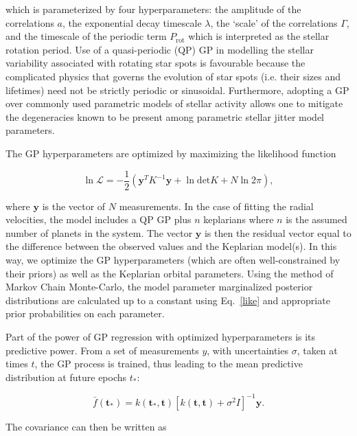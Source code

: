 \noindent which is parameterized by four hyperparameters: the amplitude of 
the correlations $a$, the exponential decay timescale $\lambda$, the `scale' of 
the correlations $\Gamma$, and the timescale of the periodic term 
$P_{\mathrm{rot}}$ which is interpreted as the stellar rotation period. 
Use of a quasi-periodic (QP) 
GP in modelling the stellar variability associated with rotating 
star spots is favourable because the complicated physics that governs the 
evolution of star spots (i.e. their sizes and lifetimes) need not be strictly 
periodic or sinusoidal. Furthermore, adopting a GP over commonly used 
parametric models of stellar activity allows one to mitigate the degeneracies 
known to be present among parametric stellar jitter model parameters.

The GP hyperparameters are optimized by maximizing the likelihood function 

\begin{equation}
\ln{\mathcal{L}} = -\frac{1}{2} \left( \textbf{y}^T K^{-1} \textbf{y} + 
\ln{\mathrm{det}K} + N \ln{2\pi} \right), \label{like}
\end{equation} 

\noindent where $\mathbf{y}$ is the vector of $N$ measurements. In the case 
of fitting the radial velocities, the model includes a QP GP plus $n$ 
keplarians where $n$ is the assumed number of planets in the system. The vector 
$\mathbf{y}$ is then the residual vector equal to the difference between the 
observed values and the Keplarian model(s). In this way, we optimize the GP 
hyperparameters (which are often well-constrained by their priors) as well as 
the Keplarian orbital parameters. Using the 
method of Markov Chain Monte-Carlo, the model parameter marginalized  
posterior distributions are 
calculated up to a constant using Eq.~\ref{like} and appropriate prior 
probabilities on each parameter. 

Part of the power of GP regression with optimized hyperparameters is 
its predictive power. From a set of measurements \textbf{$y$}, with 
uncertainties \textbf{$\sigma$}, taken at times \textbf{$t$}, the GP process 
is trained, thus leading to the mean predictive distribution at future 
epochs \textbf{$t_*$}:

\begin{equation}
\bar{f}(\mathbf{t_*}) = k(\mathbf{t_*}, \mathbf{t}) [k(\mathbf{t}, \mathbf{t}) 
+ \sigma^2 I]^{-1} \mathbf{y}. 
\end{equation}

\noindent The covariance can then be written as 

